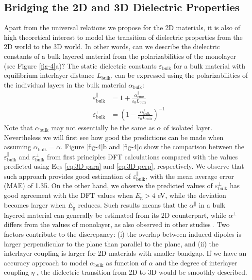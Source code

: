 \documentclass[journal=ancac3,manuscript=article,email=true,hyperref=true,keywords=false]{achemso}
\begin{document}
\subsection{Bridging the 2D and 3D Dielectric Properties}
\label{sec:2D-3D}

Apart from the universal relations we propose for the 2D materials, it
is also of high theoretical interest to model the transition of
dielectric properties from the 2D world to the 3D world. In other
words, can we describe the dielectric constants of a bulk layered
material from the polarizabilities of the monolayer (see Figure
\ref{fig-4}a)? The static dielectric constants
$\varepsilon_{\mathrm{bulk}}$ for a bulk material with equilibrium
interlayer distance $L_{\mathrm{bulk}}$, can be expressed using the
polarizabilities of the individual layers in the bulk material
$\alpha_{\mathrm{bulk}}$:
\begin{eqnarray}
  \label{eq:3D-para}
  &\varepsilon^{\parallel}_{\mathrm{bulk}} &= 1 + {\displaystyle \frac{\alpha_{\mathrm{bulk}}^{\parallel}}{\varepsilon_{0} L_{\mathrm{bulk}}}}\\
  \label{eq:3D-perp}
  &\varepsilon^{\perp}_{\mathrm{bulk}} &= \left(1 - \frac{\alpha_{\mathrm{bulk}}^{\perp}}{\varepsilon_{0} L_{\mathrm{bulk}}}\right)^{-1}
\end{eqnarray}
Note that $\alpha_{\mathrm{bulk}}$ may not essentially be the same as
$\alpha$ of isolated layer. Nevertheless we will first see how good
the predictions can be made when assuming
$\alpha_{\mathrm{bulk}}=\alpha$. Figure \ref{fig-4}b and \ref{fig-4}c
show the comparison between the
$\varepsilon_{\mathrm{bulk}}^{\parallel}$ and
$\varepsilon_{\mathrm{bulk}}^{\perp}$ from first principles DFT
calculations compared with the values predicted using Eqs
\ref{eq:3D-para} and \ref{eq:3D-perp}, respectively. We observe that
such approach provides good estimation of
$\varepsilon_{\mathrm{bulk}}^{\parallel}$, with the mean average error
(MAE) of 1.35. On the other hand, we observe the predicted values of
$\varepsilon_{\mathrm{bulk}}^{\perp}$ has good agreement with the DFT
values when $E_{\mathrm{g}}>4$ eV, while the deviation becomes larger
when $E_{\mathrm{g}}$ reduces. Such results means that the
$\alpha^{\parallel}$ in a bulk layered material can generally be
estimated from its 2D counterpart, while $\alpha^{\perp}$ differs from
the values of monolayer, as also observed in other studies
\cite{Andersen_2015_dielec_vdWH,Laturia_2018}. Two factors contribute
to the discrepancy: (i) the overlap between induced dipoles is larger
perpendicular to the plane than parallel to the plane, and (ii) the
interlayer coupling is larger for 2D materials with smaller
bandgap. If we have an accuracy approach to model
$\alpha_{\mathrm{bulk}}$ as function of $\alpha$ and the degree of
interlayer coupling $\eta$ \cite{Tkatchenko_2012}, the dielectric
transition from 2D to 3D would be smoothly described.
\end{document}
